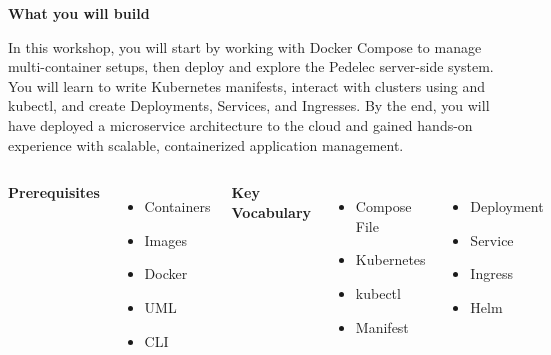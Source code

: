 
\begin{frame}[plain]
  \vspace*{0.31\paperheight}

  {\color{wsorange}\bfseries What you will build}\par\smallskip
  In this workshop, you will start by working with Docker Compose to manage
  multi-container setups, then deploy and explore the Pedelec server-side system.
  You will learn to write Kubernetes manifests, interact with clusters using
  \wsClusterPlatform{} and kubectl, and create Deployments, Services, and
  Ingresses. By the end, you will have deployed a microservice architecture to
  the cloud and gained hands-on experience with scalable, containerized
  application management.\par\bigskip

  \begin{columns}[T]
      {\color{wsorange}\bfseries Prerequisites}
      \begin{itemize}
        \item Containers \item Images \item Docker \item UML \item CLI
      \end{itemize}
      {\color{wsorange}\bfseries Key Vocabulary}
      \begin{columns}[T]
          \begin{itemize}
            \item Compose File \item Kubernetes \item kubectl \item Manifest
          \end{itemize}
          \begin{itemize}
            \item Deployment \item Service \item Ingress \item Helm
          \end{itemize}
      \end{columns}
  \end{columns}
\end{frame}

